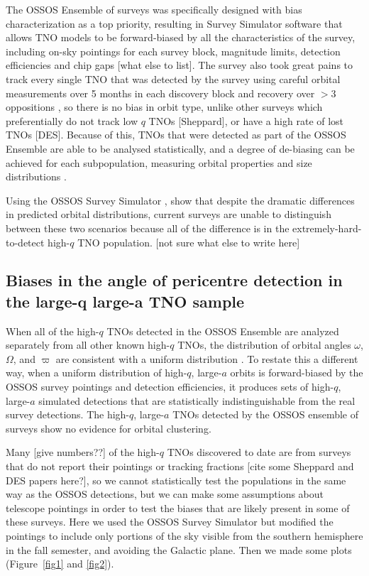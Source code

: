 \documentclass{aastex62}
\begin{document}
The OSSOS Ensemble of surveys \citep{petit11,alexandersen16,petit17,bannister18} was specifically designed with bias characterization as a top priority, resulting in Survey Simulator software that allows TNO models to be forward-biased by all the characteristics of the survey, including on-sky pointings for each survey block, magnitude limits, detection efficiencies and chip gaps [what else to list].
The survey also took great pains to track every single TNO that was detected by the survey using careful orbital measurements over 5 months in each discovery block and recovery over $>3$ oppositions \citep{bannister18}, so there is no bias in orbit type, unlike other surveys which preferentially do not track low $q$ TNOs [Sheppard], or have a high rate of lost TNOs [DES].
Because of this, TNOs that were detected as part of the OSSOS Ensemble are able to be analysed statistically, and a degree of de-biasing can be achieved for each subpopulation, measuring orbital properties and size distributions \citep{lawler2018}.

Using the OSSOS Survey Simulator \citep{petit2018,lawler2018}, \citet{lawler2017} show that despite the dramatic differences in predicted orbital distributions, current surveys are unable to distinguish between these two scenarios because all of the difference is in the extremely-hard-to-detect high-$q$ TNO population.
[not sure what else to write here]

\subsection{Biases in the angle of pericentre detection in the large-q large-a TNO sample}

When all of the high-$q$ TNOs detected in the OSSOS Ensemble are analyzed separately from all other known high-$q$ TNOs, the distribution of orbital angles $\omega$, $\Omega$, and $\varpi$ are consistent with a uniform distribution \citep{shankman17bias,bannister18}.
To restate this a different way, when a uniform distribution of high-$q$, large-$a$ orbits is forward-biased by the OSSOS survey pointings and detection efficiencies, it produces sets of high-$q$, large-$a$ simulated detections that are statistically indistinguishable from the real survey detections.
The high-$q$, large-$a$ TNOs detected by the OSSOS ensemble of surveys show no evidence for orbital clustering.

Many [give numbers??] of the high-$q$ TNOs discovered to date are from surveys that do not report their pointings or tracking fractions [cite some Sheppard and DES papers here?], so we cannot statistically test the populations in the same way as the OSSOS detections, but we can make some assumptions about telescope pointings in order to test the biases that are likely present in some of these surveys.
Here we used the OSSOS Survey Simulator \citep{petit2018,lawler2018} but modified the pointings to include only portions of the sky visible from the southern hemisphere in the fall semester, and avoiding the Galactic plane.  
Then we made some plots (Figure~\ref{fig1} and \ref{fig2}).
\end{document}
